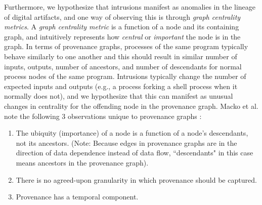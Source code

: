 \documentclass[10pt,twocolumn]{article}
\begin{document}
Furthermore, we hypothesize that intrusions manifest as anomalies in the lineage of digital artifacts, and
one way of observing this is through {\em graph centrality metrics}. A {\em graph centrality metric} is a function
of a node and its containing graph, and intuitively represents how {\em central} or {\em important} the node
is in the graph. In terms of provenance graphs, processes of the same program typically behave similarly to one another
and this should result in similar number of inputs, outputs, number of ancestors, and number of descendants for normal
process nodes of the same program.
Intrusions typically change the number of expected inputs and outputs (e.g., a process forking a shell process
when it normally does not), and we hypothesize that this can manifest as unusual changes in centrality
for the offending node in the provenance graph. Macko et al. note the following 3 observations unique to provenance graphs \cite{clustering}:
\begin{enumerate}
\item The ubiquity (importance) of a node is a function of a node's descendants, not its ancestors. (Note: Because edges in provenance graphs are in the direction of data dependence instead of data flow, ``descendants" in this case means ancestors in the provenance graph).
\item There is no agreed-upon granularity in which provenance should be captured.
\item Provenance has a temporal component.
\end{enumerate}
\end{document}

